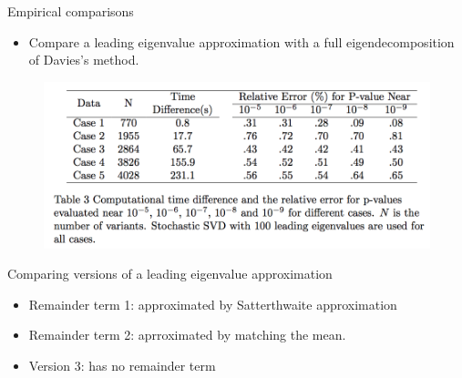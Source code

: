 \documentclass{beamer}
\begin{document}
\begin{frame}{Empirical comparisons}
\begin{itemize}
\item Compare a leading eigenvalue approximation with a full eigendecomposition of Davies's method. 
\end{itemize}
\begin{figure}[H]	 
	\includegraphics[scale = 0.65]{plot3}
\end{figure}    
\end{frame}

\begin{frame}{Comparing versions of a leading eigenvalue approximation}
\begin{itemize}
    \item Remainder term 1: approximated by Satterthwaite approximation
    \bigskip
    \item \color{red}Remainder term 2: aprroximated by matching the mean.
    \bigskip
    \item \color{blue} Version 3: has no remainder term
\end{itemize}
\end{frame}
\end{document}

